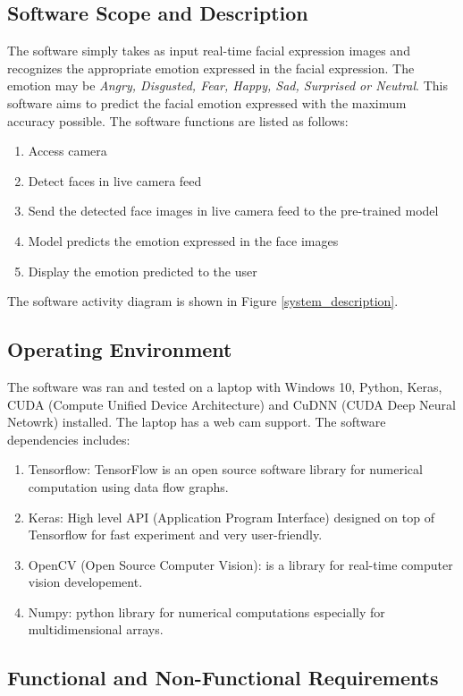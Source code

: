 \documentclass[master]{thesis-uestc}
\begin{document}
\subsection{Software Scope and Description}
The software simply takes as input real-time facial expression images and recognizes the appropriate emotion expressed in the facial expression. The emotion may be \textit{Angry, Disgusted, Fear, Happy, Sad,
Surprised or Neutral}. This software aims to predict the facial emotion expressed with the maximum accuracy possible. The software functions are listed as follows:
\begin{enumerate}
    \item Access camera
    \item Detect faces in live camera feed
    \item Send the detected face images in live camera feed to the pre-trained model
    \item Model predicts the emotion expressed in the face images
    \item Display the emotion predicted to the user
\end{enumerate}
The software activity diagram is shown in Figure \ref{system_description}.

\subsection{Operating Environment}
The software was ran and tested on a laptop with Windows 10, Python, Keras, CUDA (Compute Unified Device Architecture) and CuDNN (CUDA Deep Neural Netowrk) installed. The laptop has a web cam support. The software dependencies includes:
\begin{enumerate}
    \item Tensorflow: TensorFlow is an open source software library for numerical computation using data flow graphs.
    \item Keras: High level API (Application Program Interface) designed on top of Tensorflow for fast experiment and very user-friendly.
    \item OpenCV (Open Source Computer Vision): is a library for real-time computer vision developement.
    \item Numpy: python library for numerical computations especially for multidimensional arrays. 
\end{enumerate}

\subsection{Functional and Non-Functional Requirements}
\end{document}
